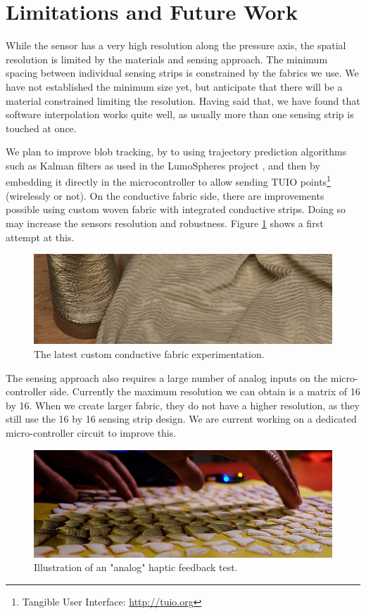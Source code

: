 \documentclass{sigchi-ext}
\begin{document}
\section{Limitations and Future Work}

While the sensor has a very high resolution along the pressure axis, the spatial resolution is limited by the materials and sensing approach. The minimum spacing between individual sensing strips is constrained by the fabrics we use. We have not established the minimum size yet, but anticipate that there will be a material constrained limiting the resolution.
Having said that, we have found that software interpolation works quite well, as usually more than one sensing strip is touched at once.

We plan to improve blob tracking, by to using trajectory prediction algorithms such as Kalman filters as used in the LumoSpheres project \cite{lumospheres}, and then by embedding it directly in the microcontroller to allow sending TUIO points\footnote{Tangible User Interface: \url{http://tuio.org}} (wirelessly or not).
On the conductive fabric side, there are improvements possible using custom woven fabric with integrated conductive strips. Doing so may increase the sensors resolution and robustness. Figure \ref{fig:zebra_fabric} shows a first attempt at this.

\begin{figure}[!h]
    \centering
    \includegraphics[width=\columnwidth]{figures/zebra_fabric}
    \caption{The latest custom conductive fabric experimentation.}\label{fig:zebra_fabric}
\end{figure}

The sensing approach also requires a large number of analog inputs on the micro-controller side. Currently the maximum resolution we can obtain is a matrix of 16 by 16. When we create larger fabric, they do not have a higher resolution, as they still use the 16 by 16 sensing strip design. We are current working on a dedicated micro-controller circuit to improve this.

\begin{figure}[!h]
    \centering
    \includegraphics[width=\columnwidth]{figures/zoom}
    \caption{Illustration of an "analog" haptic feedback test.}\label{fig:zoom}
\end{figure}
\end{document}
